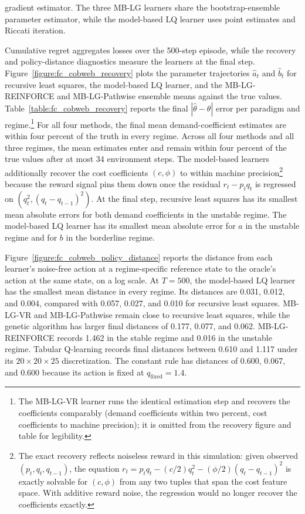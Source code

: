 gradient estimator. The three MB-LG learners share the bootstrap-ensemble parameter estimator, while the model-based LQ learner uses point estimates and Riccati iteration.

Cumulative regret aggregates losses over the 500-step episode, while the recovery and policy-distance diagnostics measure the learners at the final step. Figure~\ref{figure:fc_cobweb_recovery} plots the parameter trajectories $\hat a_t$ and $\hat b_t$ for recursive least squares, the model-based LQ learner, and the MB-LG-REINFORCE and MB-LG-Pathwise ensemble means against the true values. Table~\ref{table:fc_cobweb_recovery} reports the final $|\hat\theta - \theta|$ error per paradigm and regime.\footnote{The MB-LG-VR learner runs the identical estimation step and recovers the coefficients comparably (demand coefficients within two percent, cost coefficients to machine precision); it is omitted from the recovery figure and table for legibility.} For all four methods, the final mean demand-coefficient estimates are within four percent of the truth in every regime. Across all four methods and all three regimes, the mean estimates enter and remain within four percent of the true values after at most 34 environment steps. The model-based learners additionally recover the cost coefficients $(c, \phi)$ to within machine precision\footnote{The exact recovery reflects noiseless reward in this simulation: given observed $(p_t, q_t, q_{t-1})$, the equation $r_t = p_t q_t - (c/2) q_t^2 - (\phi/2)(q_t - q_{t-1})^2$ is exactly solvable for $(c, \phi)$ from any two tuples that span the cost feature space. With additive reward noise, the regression would no longer recover the coefficients exactly.} because the reward signal pins them down once the residual $r_t - p_t q_t$ is regressed on $(q_t^2, (q_t - q_{t-1})^2)$. At the final step, recursive least squares has its smallest mean absolute errors for both demand coefficients in the unstable regime. The model-based LQ learner has its smallest mean absolute error for $a$ in the unstable regime and for $b$ in the borderline regime.

Figure~\ref{figure:fc_cobweb_policy_distance} reports the distance from each learner's noise-free action at a regime-specific reference state to the oracle's action at the same state, on a log scale. At $T = 500$, the model-based LQ learner has the smallest mean distance in every regime. Its distances are 0.031, 0.012, and 0.004, compared with 0.057, 0.027, and 0.010 for recursive least squares. MB-LG-VR and MB-LG-Pathwise remain close to recursive least squares, while the genetic algorithm has larger final distances of 0.177, 0.077, and 0.062. MB-LG-REINFORCE records 1.462 in the stable regime and 0.016 in the unstable regime. Tabular Q-learning records final distances between 0.610 and 1.117 under its $20 \times 20 \times 25$ discretization. The constant rule has distances of 0.600, 0.067, and 0.600 because its action is fixed at $q_{\text{fixed}} = 1.4$.

